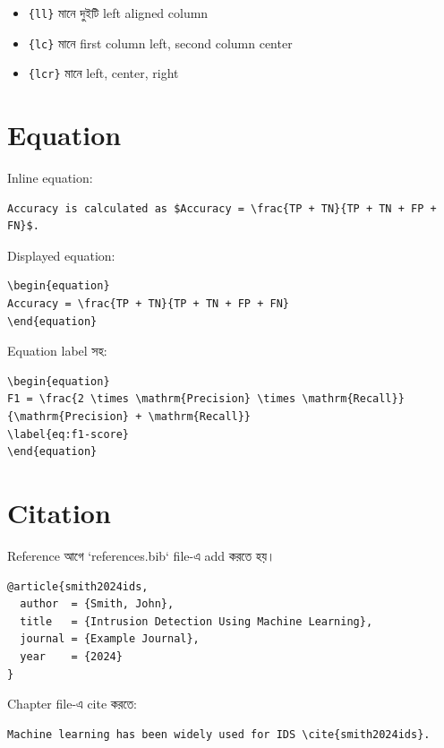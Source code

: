 \documentclass[12pt,a4paper]{article}
\newcommand{\bn}[1]{{\normalfont\banglafont #1}}
\newcommand{\code}[1]{\texttt{#1}}
\begin{document}
\begin{itemize}
  \item \code{\{ll\}} \bn{মানে দুইটি left aligned column}
  \item \code{\{lc\}} \bn{মানে first column left, second column center}
  \item \code{\{lcr\}} \bn{মানে left, center, right}
\end{itemize}

\section{\bn{Equation}}

\bn{Inline equation:}

\begin{verbatim}
Accuracy is calculated as $Accuracy = \frac{TP + TN}{TP + TN + FP + FN}$.
\end{verbatim}

\bn{Displayed equation:}

\begin{verbatim}
\begin{equation}
Accuracy = \frac{TP + TN}{TP + TN + FP + FN}
\end{equation}
\end{verbatim}

\bn{Equation label সহ:}

\begin{verbatim}
\begin{equation}
F1 = \frac{2 \times \mathrm{Precision} \times \mathrm{Recall}}
{\mathrm{Precision} + \mathrm{Recall}}
\label{eq:f1-score}
\end{equation}
\end{verbatim}

\section{\bn{Citation}}

\bn{Reference আগে `references.bib` file-এ add করতে হয়।}

\begin{verbatim}
@article{smith2024ids,
  author  = {Smith, John},
  title   = {Intrusion Detection Using Machine Learning},
  journal = {Example Journal},
  year    = {2024}
}
\end{verbatim}

\bn{Chapter file-এ cite করতে:}

\begin{verbatim}
Machine learning has been widely used for IDS \cite{smith2024ids}.
\end{verbatim}
\end{document}
